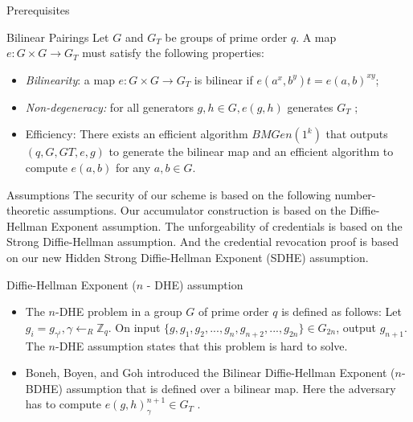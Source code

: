 \documentclass{beamer}
\begin{document}
\begin{frame}{Prerequisites}
    \begin{block}{Bilinear Pairings}
    Let $G$ and $G_T$ be groups of prime order $q$. A map $e : G \times G \rightarrow G_T$ must satisfy the following properties:
    \begin{itemize}
        \justifying
        \item \textit{Bilinearity}: a map $e : G \times G \rightarrow G_T$ is bilinear if $e(a^x, b^y)t = e(a, b)^{xy}$;
        \item \textit{Non-degeneracy:} for all generators $g, h \in G, e(g, h)$ generates $G_T$ ;
        \item Efficiency: There exists an efficient algorithm $BMGen(1^k)$ that outputs $(q, G, GT , e, g)$ to generate the bilinear map and an efficient algorithm to compute $e(a, b)$ for any $a, b \in G$.
    \end{itemize}
    \end{block}
\end{frame}

\begin{frame}{Assumptions}
    \justify
    The security of our scheme is based on the following number-theoretic assumptions. Our accumulator construction is based on the Diffie-Hellman Exponent assumption. The unforgeability of credentials is based on the Strong Diffie-Hellman assumption. And the credential revocation proof is based on our new Hidden Strong Diffie-Hellman Exponent (SDHE) assumption.
    \begin{block}{Diffie-Hellman Exponent ($n$ - DHE) assumption}
    \begin{itemize}
        \justifying
        \item  The $n$-DHE problem in a group $G$ of prime order $q$ is defined as follows: Let $g_i = g_{\gamma^i}, \gamma \leftarrow_R \mathbb{Z}_q$. On input $\{g, g_1, g_2,...,g_n, g_{n+2},...,g_{2n}\} \in G_{2n}$, output $g_{n+1}$. The $n$-DHE assumption states that this problem is hard to solve.
        \item Boneh, Boyen, and Goh introduced the Bilinear Diffie-Hellman Exponent ($n$-BDHE) assumption that is defined over a bilinear map. Here the adversary has to compute $e(g, h)_\gamma^{n+1} \in G_T$ .
    \end{itemize}
    \end{block}
\end{frame}
\end{document}
